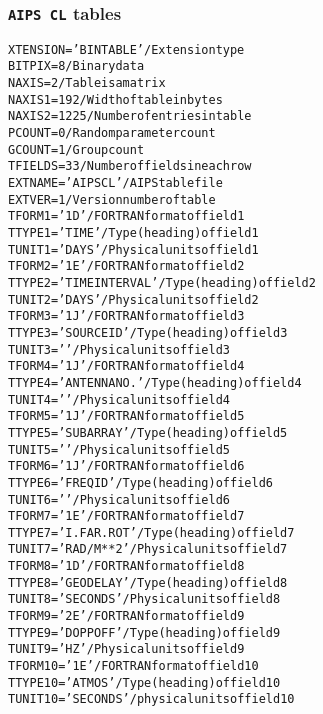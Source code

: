 \documentclass[twoside]{article}
\begin{document}
\subsubsection{{\tt AIPS CL} tables}
\label{Appe:CLtable}
\begin{alltt}
XTENSION= 'BINTABLE'           / Extension type
BITPIX  =                    8 / Binary data
NAXIS   =                    2 / Table is a matrix
NAXIS1  =                  192 / Width of table in bytes
NAXIS2  =                 1225 / Number of entries in table
PCOUNT  =                    0 / Random parameter count
GCOUNT  =                    1 / Group count
TFIELDS =                   33 / Number of fields in each row
EXTNAME = 'AIPS CL '           / AIPS table file
EXTVER  =                    1 / Version number of table
TFORM1  = '1D      '           / FORTRAN format of field  1
TTYPE1  = 'TIME            '   / Type (heading) of field  1
TUNIT1  = 'DAYS    '           / Physical units of field  1
TFORM2  = '1E      '           / FORTRAN format of field  2
TTYPE2  = 'TIME INTERVAL   '   / Type (heading) of field  2
TUNIT2  = 'DAYS    '           / Physical units of field  2
TFORM3  = '1J      '           / FORTRAN format of field  3
TTYPE3  = 'SOURCE ID       '   / Type (heading) of field  3
TUNIT3  = '        '           / Physical units of field  3
TFORM4  = '1J      '           / FORTRAN format of field  4
TTYPE4  = 'ANTENNA NO.     '   / Type (heading) of field  4
TUNIT4  = '        '           / Physical units of field  4
TFORM5  = '1J      '           / FORTRAN format of field  5
TTYPE5  = 'SUBARRAY        '   / Type (heading) of field  5
TUNIT5  = '        '           / Physical units of field  5
TFORM6  = '1J      '           / FORTRAN format of field  6
TTYPE6  = 'FREQ ID         '   / Type (heading) of field  6
TUNIT6  = '        '           / Physical units of field  6
TFORM7  = '1E      '           / FORTRAN format of field  7
TTYPE7  = 'I.FAR.ROT       '   / Type (heading) of field  7
TUNIT7  = 'RAD/M**2'           / Physical units of field  7
TFORM8  = '1D      '           / FORTRAN format of field  8
TTYPE8  = 'GEODELAY        '   / Type (heading) of field  8
TUNIT8  = 'SECONDS '           / Physical units of field  8
TFORM9  = '2E      '           / FORTRAN format of field  9
TTYPE9  = 'DOPPOFF         '   / Type (heading) of field  9
TUNIT9  = 'HZ      '           / Physical units of field  9
TFORM10 = '1E      '           / FORTRAN format of field 10
TTYPE10 = 'ATMOS           '   / Type (heading) of field 10
TUNIT10 = 'SECONDS '           / physical units of field 10

\end{alltt}
\end{document}
